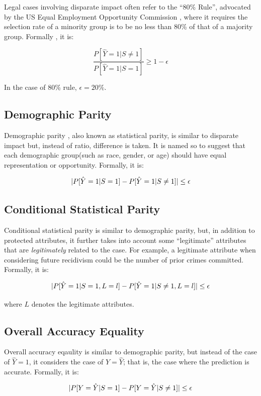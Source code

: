 \documentclass[conference]{IEEEtran}
\begin{document}
Legal cases involving disparate impact often refer to the ``80\% Rule'', advocated by the US Equal Employment Opportunity Commission \cite{eeoc1979}, where it requires the selection rate of a minority group is to be no less than 80\% of that of a majority group. Formally \cite{feldman2015certifying}, it is:

\[
    \frac{P[\hat{Y} = 1 | S \neq 1]}{P[\hat{Y} = 1 | S = 1]} \geq 1 - \epsilon
\]

In the case of 80\% rule, $\epsilon = 20\%$.

\subsection{Demographic Parity} %
Demographic parity \cite{calders2010three}, also known as statistical parity, is similar to disparate impact but, instead of ratio, difference is taken. It is named so to suggest that each demographic group(such as race, gender, or age) should have equal representation or opportunity. Formally, it is:

\[
    \lvert P[\hat{Y} = 1 | S = 1] - P[\hat{Y} = 1 | S \neq 1]\rvert \leq \epsilon
\]

\subsection{Conditional Statistical Parity}
Conditional statistical parity \cite{corbett2017algorithmic} is similar to demographic parity, but, in addition to protected attributes, it further takes into account some ``legitimate'' attributes that are \textit{legitimately} related to the case. For example, a legitimate attribute when considering future recidivism could be the number of prior crimes committed. Formally, it is:

\[
    \lvert P[\hat{Y} = 1 | S = 1, L = l] - P[\hat{Y} = 1 | S \neq 1, L = l]\rvert \leq \epsilon
\]

where $L$ denotes the legitimate attributes.

\subsection{Overall Accuracy Equality}
Overall accuracy eqaulity \cite{berk2021fairness} is similar to demographic parity, but instead of the case of $\hat{Y} = 1$, it considers the case of $Y = \hat{Y}$; that is, the case where the prediction is accurate. Formally, it is:

\[
    \lvert P[Y = \hat{Y} | S = 1] - P[Y = \hat{Y} | S \neq 1]\rvert \leq \epsilon
\]
\end{document}
